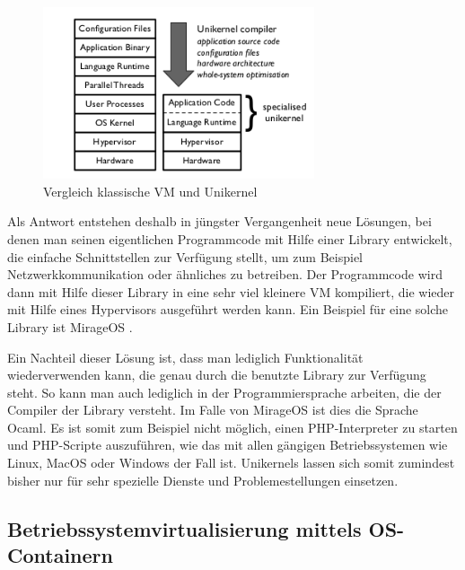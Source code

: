 \begin{figure}[!ht]
  \begin{center}
    \includegraphics[width=8cm]{bilder/comparison-vm-unikernel.png}
    \caption{Vergleich klassische VM und Unikernel \citep[Abb. 1]{MadMorAnd13}}
  \end{center}
\end{figure}

Als Antwort entstehen deshalb in jüngster Vergangenheit neue Lösungen, bei denen man seinen eigentlichen Programmcode mit Hilfe einer Library entwickelt, die einfache Schnittstellen zur Verfügung stellt, um zum Beispiel Netzwerkkommunikation oder ähnliches zu betreiben. Der Programmcode wird dann mit Hilfe dieser Library in eine sehr viel kleinere \ac{VM} kompiliert, die wieder mit Hilfe eines Hypervisors ausgeführt werden kann. Ein Beispiel für eine solche Library ist MirageOS \citep[Vgl.][]{MadMorAnd13}.

Ein Nachteil dieser Lösung ist, dass man lediglich Funktionalität wiederverwenden kann, die genau durch die benutzte Library zur Verfügung steht. So kann man auch lediglich in der Programmiersprache arbeiten, die der Compiler der Library versteht. Im Falle von MirageOS ist dies die Sprache Ocaml. Es ist somit zum Beispiel nicht möglich, einen PHP-Interpreter zu starten und PHP-Scripte auszuführen, wie das mit allen gängigen Betriebssystemen wie Linux, MacOS oder Windows der Fall ist. Unikernels lassen sich somit zumindest bisher nur für sehr spezielle Dienste und Problemestellungen einsetzen.

\subsection{Betriebssystemvirtualisierung mittels OS-Containern}

